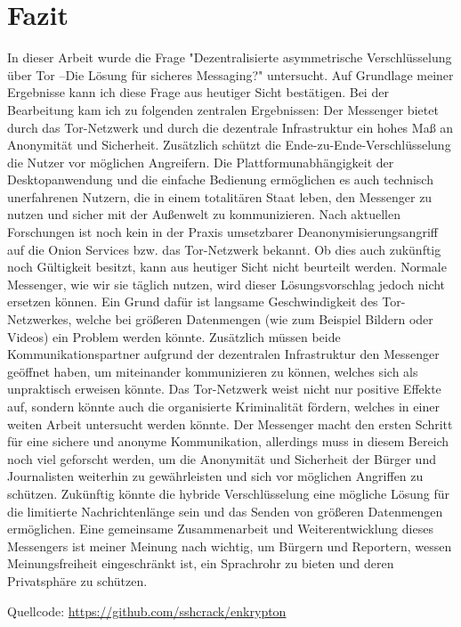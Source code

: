 \documentclass[a4paper,ngerman, headheight=28pt,12pt, footheight=27pt]{scrartcl}
\newcommand{\LongMinus}{–}
\begin{document}
\section{Fazit}
In dieser Arbeit wurde die Frage "Dezentralisierte asymmetrische Verschlüsselung über Tor \LongMinus Die Lösung für sicheres Messaging?" untersucht.
Auf Grundlage meiner Ergebnisse kann ich diese Frage aus heutiger Sicht bestätigen. Bei der Bearbeitung kam ich zu folgenden zentralen Ergebnissen:
Der Messenger bietet durch das Tor-Netzwerk und durch die dezentrale Infrastruktur ein hohes Maß an Anonymität und Sicherheit.
Zusätzlich schützt die Ende-zu-Ende-Verschlüsselung die Nutzer vor möglichen Angreifern.
Die Plattformunabhängigkeit der Desktopanwendung und die einfache Bedienung ermöglichen es auch technisch unerfahrenen Nutzern, die in einem totalitären Staat leben, den Messenger zu nutzen und sicher mit der Außenwelt zu kommunizieren.
Nach aktuellen Forschungen ist noch kein in der Praxis umsetzbarer Deanonymisierungsangriff auf die Onion Services bzw. das Tor-Netzwerk bekannt. Ob dies auch zukünftig noch Gültigkeit besitzt, kann aus heutiger Sicht nicht beurteilt werden.
Normale Messenger, wie wir sie täglich nutzen, wird dieser Lösungsvorschlag jedoch nicht ersetzen können.
Ein Grund dafür ist langsame Geschwindigkeit des Tor-Netzwerkes, welche bei größeren Datenmengen (wie zum Beispiel Bildern oder Videos) ein Problem werden könnte.
Zusätzlich müssen beide Kommunikationspartner aufgrund der dezentralen Infrastruktur den Messenger geöffnet haben, um miteinander kommunizieren zu können, welches sich als unpraktisch erweisen könnte.
Das Tor-Netzwerk weist nicht nur positive Effekte auf, sondern könnte auch die organisierte Kriminalität fördern, welches in einer weiten Arbeit untersucht werden könnte.
Der Messenger macht den ersten Schritt für eine sichere und anonyme Kommunikation, allerdings muss in diesem Bereich noch viel geforscht werden, um die Anonymität und Sicherheit der Bürger und Journalisten weiterhin zu gewährleisten und sich vor möglichen Angriffen zu schützen. Zukünftig könnte die hybride Verschlüsselung eine mögliche Lösung für die limitierte Nachrichtenlänge sein und das Senden von größeren Datenmengen ermöglichen.
Eine gemeinsame Zusammenarbeit und Weiterentwicklung dieses Messengers ist meiner Meinung nach wichtig, um Bürgern und Reportern, wessen Meinungsfreiheit eingeschränkt ist, ein Sprachrohr zu bieten und deren Privatsphäre zu schützen.
\newpage
\nolinenumbers{}
\printbibliography[notkeyword={figure}]
\label{LastPageDoc}

\newpage
{}%
\appendix
\printbibliography[heading=subbibliography,title={Anhang},keyword={figure}]
Quellcode: \href{https://github.com/sshcrack/enkrypton}{https://github.com/sshcrack/enkrypton}

\end{document}
